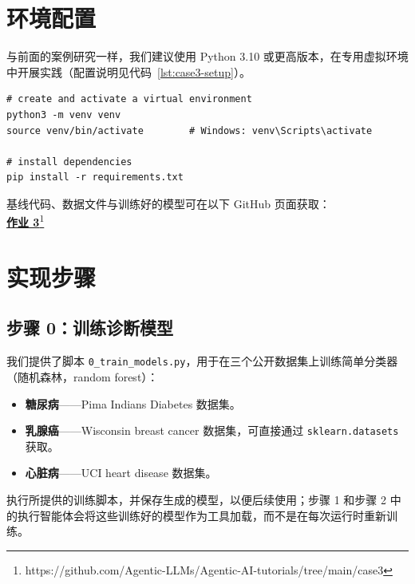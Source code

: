 \section{环境配置}
\label{sec:case3-setup}

与前面的案例研究一样，我们建议使用 Python 3.10 或更高版本，在专用虚拟环境中开展实践（配置说明见代码~\ref{lst:case3-setup}）。

\begin{listing}[!ht]
\begin{verbatim}
# create and activate a virtual environment
python3 -m venv venv
source venv/bin/activate        # Windows: venv\Scripts\activate

# install dependencies
pip install -r requirements.txt
\end{verbatim}
\caption{配置案例研究 3 的环境}
\label{lst:case3-setup}
\end{listing}

\begin{tcolorbox}[
    colback=blue!10!white,
    colframe=blue!85!black,
    title={\faRocket\quad 在 GitHub 上查看！},
    fonttitle=\bfseries,
    coltitle=white,
    boxrule=1pt,
    arc=4pt,
    left=5pt,
    right=5pt,
    top=5pt,
    bottom=5pt,
    enhanced
]
基线代码、数据文件与训练好的模型可在以下 GitHub 页面获取：\\
\href{https://github.com/Agentic-LLMs/Agentic-AI-tutorials/tree/main/case3}{\faCode\quad \textbf{作业 3}\footnote{https://github.com/Agentic-LLMs/Agentic-AI-tutorials/tree/main/case3}}
\end{tcolorbox}


\section{实现步骤}
\label{sec:case3-implementation}

\subsection{步骤 0：训练诊断模型}

我们提供了脚本 \texttt{0\_train\_models.py}，用于在三个公开数据集上训练简单分类器（随机森林，random forest）：

\begin{itemize}
    \item \textbf{糖尿病}——Pima Indians Diabetes 数据集。
    \item \textbf{乳腺癌}——Wisconsin breast cancer 数据集，可直接通过 \texttt{sklearn.datasets} 获取。
    \item \textbf{心脏病}——UCI heart disease 数据集。
\end{itemize}
执行所提供的训练脚本，并保存生成的模型，以便后续使用；步骤 1 和步骤 2 中的执行智能体会将这些训练好的模型作为工具加载，而不是在每次运行时重新训练。

